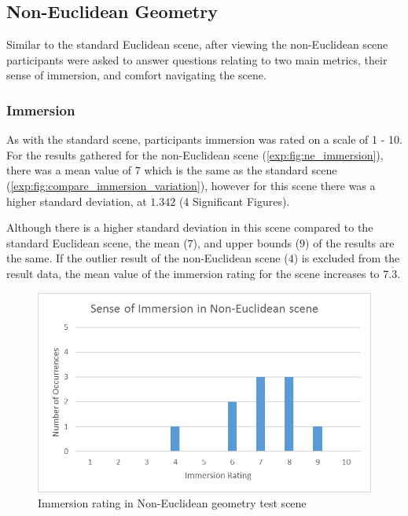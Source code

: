 		\subsection{Non-Euclidean Geometry}
		\label{exp:exp:ne}

			Similar to the standard Euclidean scene, after viewing the non-Euclidean scene participants were asked to answer questions relating to two main metrics, their sense of immersion, and comfort navigating the scene.

			\subsubsection{Immersion}

				As with the standard scene, participants immersion was rated on a scale of 1 - 10.
				For the results gathered for the non-Euclidean scene (\autoref{exp:fig:ne_immersion}), there was a mean value of $7$ which is the same as the standard scene (\autoref{exp:fig:compare_immersion_variation}), however for this scene there was a higher standard deviation, at $1.342$ (4 Significant Figures).

				Although there is a higher standard deviation in this scene compared to the standard Euclidean scene, the mean ($7$), and upper bounds ($9$) of the results are the same.
				If the outlier result of the non-Euclidean scene ($4$) is excluded from the result data, the mean value of the immersion rating for the scene increases to $7.\dot{3}$.

				\begin{figure}[h]
					\includegraphics[width=1\textwidth]{Images/NE_Immersion}
					\centering
					\caption{Immersion rating in Non-Euclidean geometry test scene}
					\label{exp:fig:ne_immersion}
				\end{figure}

